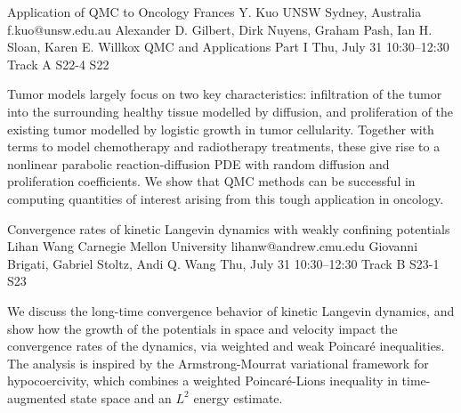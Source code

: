 \begin{talk}
  {Application of QMC to Oncology}%
  {Frances Y. Kuo}%
  {UNSW Sydney, Australia}%
  {f.kuo@unsw.edu.au}%
  {Alexander D. Gilbert, Dirk Nuyens, Graham Pash, Ian H. Sloan, Karen E. Willkox}%
  {QMC and Applications Part I}%
  {Thu, July 31 10:30–12:30 Track A}%
  {S22-4}%
  {S22}%
				
			
Tumor models largely focus on two key characteristics: infiltration of the tumor into the surrounding healthy tissue modelled by diffusion, and proliferation of the existing tumor modelled by logistic growth in tumor cellularity. Together with terms to model chemotherapy and radiotherapy treatments, these give rise to a nonlinear parabolic reaction-diffusion PDE with random diffusion and proliferation coefficients. We show that QMC methods can be successful in computing quantities of interest arising from this tough application in oncology.

%
%
\end{talk}

\begin{talk}
  {Convergence rates of kinetic Langevin dynamics with weakly confining potentials}%
  {Lihan Wang}%
  {Carnegie Mellon University}%
  {lihanw@andrew.cmu.edu}%
  {Giovanni Brigati, Gabriel Stoltz, Andi Q. Wang}%
  {}%
  {Thu, July 31 10:30–12:30 Track B}%
  {S23-1}%
  {S23}%
  
				
			
We discuss the long-time convergence behavior of kinetic Langevin dynamics, and show how the growth of the potentials in space and velocity impact the convergence rates of the dynamics, via weighted and weak Poincar\'e inequalities. The analysis is inspired by the Armstrong-Mourrat variational framework for hypocoercivity, which combines a weighted Poincaré-Lions inequality in time-augmented state space and an $L^2$ energy estimate.


\end{talk}

